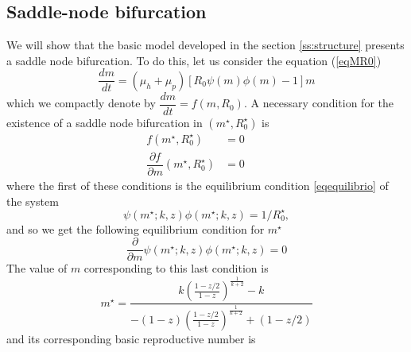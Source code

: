 \documentclass[12pt,a4paper]{article}
\theoremstyle{plain}%
\theoremstyle{definition}
\theoremstyle{remark}
\begin{document}
\subsection{Saddle-node bifurcation}\label{bifurcacion}
We will show that the basic model developed in the section \ref{ss:structure} presents a saddle node bifurcation. To do this, let us consider the equation (\ref{eqMR0})
\begin{equation*}
\dfrac{dm}{dt}=(\mu_h + \mu_p)\left[ R_0  \psi(m)\phi(m) -1 \right] m%
\end{equation*}
which we compactly denote by
$\dfrac{dm}{dt}=f(m,R_0)$.
A necessary condition for the existence of a saddle node bifurcation in
$(m^{\star},R_0^{\star})$ is
\begin{equation}
\begin{split}
f(m^{\star},R_0^{\star})&=0\qquad\\
\dfrac{\partial f}{\partial m}(m^{\star},R_0^{\star})&=0
\end{split}
\end{equation}
where the first of these conditions is the equilibrium condition \eqref{eqequilibrio} of the system
\begin{equation*}
\psi(m^{\star};k,z)\phi(m^{\star};k,z)=1/R_0^{\star},
\end{equation*}
and so we get the following equilibrium condition for $m^{\star}$
\begin{equation}
\frac{\partial }{\partial m}\psi(m^{\star};k,z)\phi(m^{\star};k,z)=0	
\end{equation}
The value of $m$ corresponding to this last condition is
\begin{equation}
m^{\star}=\dfrac{k\left( \frac{1-z/2}{1-z}\right)^{\frac{1}{k+2}} - k}{-(1-z)\left( \frac{1-z/2}{1-z}\right)^{\frac{1}{k+2}} + (1-z/2)}	
\end{equation}
and its corresponding basic reproductive number is
\end{document}
